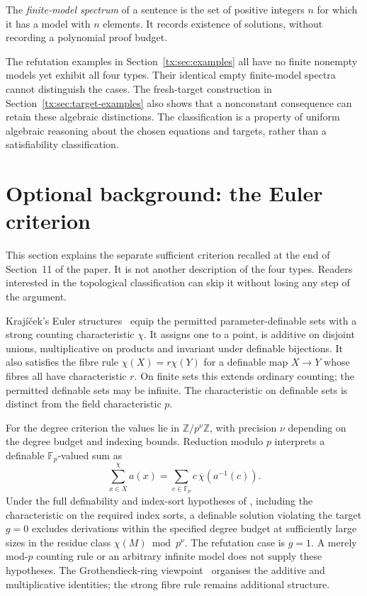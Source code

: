 The \emph{finite-model spectrum} of a sentence is the set of positive
integers $n$ for which it has a model with $n$ elements. It records
existence of solutions, without recording a polynomial proof budget.

The refutation examples in Section~\ref{tx:sec:examples} all have no
finite nonempty models yet exhibit all four types. Their identical empty
finite-model spectra cannot distinguish the cases. The fresh-target
construction in Section~\ref{tx:sec:target-examples} also shows that a
nonconstant consequence can retain these algebraic distinctions. The
classification is a property of uniform algebraic reasoning about the
chosen equations and targets, rather than a satisfiability classification.

\section{Optional background: the Euler criterion}
\label{tx:sec:euler-background}
This section explains the separate sufficient criterion recalled at the
end of Section~11 of the paper. It is not another description of the
four types. Readers interested in the topological classification can
skip it without losing any step of the argument.

Kraj\'i\v cek's Euler structures~\cite{KrajEuler} equip the permitted
parameter-definable sets with a strong counting characteristic $\chi$.
It assigns one to a point, is additive on disjoint unions,
multiplicative on products and invariant under definable bijections.
It also satisfies the fibre rule $\chi(X)=r\chi(Y)$ for a definable
map $X\to Y$ whose fibres all have characteristic $r$. On finite sets
this extends ordinary counting; the permitted definable sets may be
infinite. The characteristic on definable sets is distinct from the
field characteristic $p$.

For the degree criterion the values lie in $\mathbb Z/p^\nu\mathbb Z$,
with precision $\nu$ depending on the degree budget and indexing bounds.
Reduction modulo $p$ interprets a definable $\mathbb F_p$-valued sum as
\[
 \sum_{x\in X}^{\chi}a(x)
       =\sum_{c\in\mathbb F_p}c\,\overline\chi(a^{-1}(c)).
\]
Under the full definability and index-sort hypotheses of
\cite[Theorem~6.1]{KrajEuler}, including the characteristic on the
required index sorts, a definable solution violating the target $g=0$
excludes derivations within the specified degree budget at sufficiently
large sizes in the residue class $\chi(M)\bmod p^\nu$.
The refutation case is $g=1$. A merely mod-$p$ counting rule or an
arbitrary infinite model does not supply these hypotheses. The
Grothendieck-ring viewpoint~\cite{KrajScanlon} organises the additive
and multiplicative identities; the strong fibre rule remains additional
structure.

